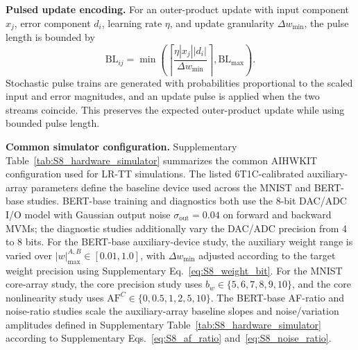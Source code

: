 \documentclass[fleqn,10pt]{wlscirep}
\begin{document}
\noindent\textbf{Pulsed update encoding.}
For an outer-product update with input component \(x_j\), error component \(d_i\), learning rate \(\eta\), and update granularity \(\Delta w_{\min}\), the pulse length is bounded by
\begin{equation}
\mathrm{BL}_{ij}
=
\min
\left(
\left\lceil
\frac{\eta |x_j||d_i|}{\Delta w_{\min}}
\right\rceil,
\mathrm{BL}_{\max}
\right).
\label{eq:S8_bl}
\end{equation}
Stochastic pulse trains are generated with probabilities proportional to the scaled input and error magnitudes, and an update pulse is applied when the two streams coincide. This preserves the expected outer-product update while using bounded pulse length.

\noindent\textbf{Common simulator configuration.}
Supplementary Table~\ref{tab:S8_hardware_simulator} summarizes the common AIHWKIT configuration used for LR-TT simulations. The listed 6T1C-calibrated auxiliary-array parameters define the baseline device used across the MNIST and BERT-base studies. BERT-base training and diagnostics both use the 8-bit DAC/ADC I/O model with Gaussian output noise \(\sigma_{\mathrm{out}}=0.04\) on forward and backward MVMs; the diagnostic studies additionally vary the DAC/ADC precision from 4 to 8 bits. For the BERT-base auxiliary-device study, the auxiliary weight range is varied over \(|w|_{\max}^{A,B}\in[0.01,1.0]\), with \(\Delta w_{\min}\) adjusted according to the target weight precision using Supplementary Eq.~\eqref{eq:S8_weight_bit}. For the MNIST core-array study, the core precision study uses \(b_w\in\{5,6,7,8,9,10\}\), and the core nonlinearity study uses \(\mathrm{AF}^{C}\in\{0,0.5,1,2,5,10\}\). The BERT-base AF-ratio and noise-ratio studies scale the auxiliary-array baseline slopes and noise/variation amplitudes defined in Supplementary Table~\ref{tab:S8_hardware_simulator} according to Supplementary Eqs.~\eqref{eq:S8_af_ratio} and~\eqref{eq:S8_noise_ratio}.
\end{document}
